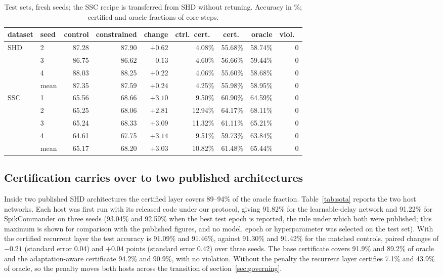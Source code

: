 \documentclass{iopjournal}
\begin{document}
\begin{table}
\caption{\label{tab:test}Test sets, fresh seeds; the SSC recipe is transferred from SHD without retuning. Accuracy in \%; certified and oracle fractions of core-steps.}
\centering
\begin{tabular}{llrrrrrrr}
\hline
dataset & seed & control & constrained & change & ctrl.\ cert.\ & cert.\ & oracle & viol.\ \\
\hline
SHD & 2 & 87.28 & 87.90 & $+0.62$ & 4.08\% & 55.68\% & 58.74\% & 0 \\
    & 3 & 86.75 & 86.62 & $-0.13$ & 4.60\% & 56.66\% & 59.44\% & 0 \\
    & 4 & 88.03 & 88.25 & $+0.22$ & 4.06\% & 55.60\% & 58.68\% & 0 \\
    & mean & 87.35 & 87.59 & $+0.24$ & 4.25\% & 55.98\% & 58.95\% & 0 \\
\hline
SSC & 1 & 65.56 & 68.66 & $+3.10$ & 9.50\%  & 60.90\% & 64.59\% & 0 \\
    & 2 & 65.25 & 68.06 & $+2.81$ & 12.94\% & 64.17\% & 68.11\% & 0 \\
    & 3 & 65.24 & 68.33 & $+3.09$ & 11.32\% & 61.11\% & 65.21\% & 0 \\
    & 4 & 64.61 & 67.75 & $+3.14$ & 9.51\%  & 59.73\% & 63.84\% & 0 \\
    & mean & 65.17 & 68.20 & $+3.03$ & 10.82\% & 61.48\% & 65.44\% & 0 \\
\hline
\end{tabular}
\end{table}

\subsection{Certification carries over to two published architectures}
\label{sec:sota}

Inside two published SHD architectures the certified layer covers 89--94\% of the oracle fraction. Table~\ref{tab:sota} reports the two host networks. Each host was first run with its released code under our protocol, giving 91.82\% for the learnable-delay network and 91.22\% for SpikCommander on three seeds (93.04\% and 92.59\% when the best test epoch is reported, the rule under which both were published; this maximum is shown for comparison with the published figures, and no model, epoch or hyperparameter was selected on the test set). With the certified recurrent layer the test accuracy is 91.09\% and 91.46\%, against 91.30\% and 91.42\% for the matched controls, paired changes of $-0.21$ (standard error 0.04) and $+0.04$ points (standard error 0.42) over three seeds. The base certificate covers 91.9\% and 89.2\% of oracle and the adaptation-aware certificate 94.2\% and 90.9\%, with no violation. Without the penalty the recurrent layer certifies 7.1\% and 43.9\% of oracle, so the penalty moves both hosts across the transition of section~\ref{sec:governing}.
\end{document}
